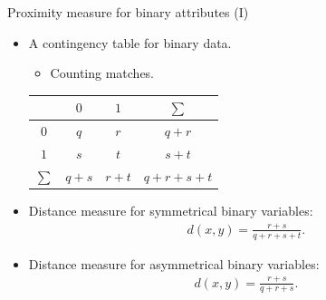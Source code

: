 \documentclass[aspectratio=169,t]{beamer}
\begin{document}
  { 
    \begin{frame}{Proximity measure for binary attributes (I)}
    \begin{itemize}
      \item A contingency table for binary data.
      \begin{itemize}
        \item Counting matches.
      \end{itemize}
      \begin{center}
        \begin{tabular}{ c | c c c }
         & $0$ & $1$ & $\sum$ \\ \hline
         $0$ & $q$ & $r$ & $q+r$\\  
         $1$ & $s$ & $t$ & $s+t$\\
         $\sum$ & $q+s$ & $r+t$ & $q+r+s+t$   
        \end{tabular}
      \end{center}
      \item Distance measure for symmetrical binary variables:
      \begin{align}
        d(x,y) = \frac{r+s}{q+r+s+t}.
      \end{align}
      \item Distance measure for asymmetrical binary variables:
      \begin{align}
        d(x,y) = \frac{r+s}{q+r+s}.
      \end{align}
    \end{itemize}
    \end{frame}
  }
\end{document}
